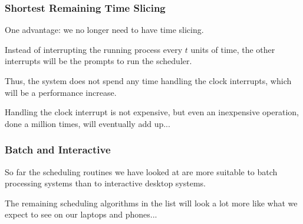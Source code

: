 \begin{frame}
\frametitle{Shortest Remaining Time Slicing}

One advantage: we no longer need to have time slicing. 

Instead of interrupting the running process every $t$ units of time, the other interrupts will be the prompts to run the scheduler. 

Thus, the system does not spend any time handling the clock interrupts, which will be a performance increase. 

Handling the clock interrupt is not expensive, but even an inexpensive operation, done a million times, will eventually add up...


\end{frame}



\begin{frame}
\frametitle{Batch and Interactive}

So far the scheduling routines we have looked at are more suitable to batch processing systems than to interactive desktop systems. 

The remaining scheduling algorithms in the list will look a lot more like what we expect to see on our laptops and phones...


\end{frame}



